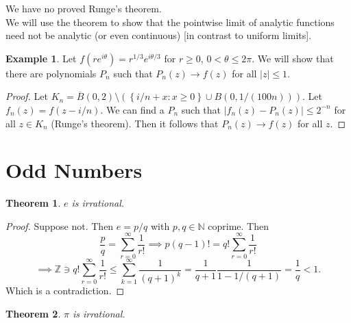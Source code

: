 \documentclass[a4paper, 10pt, twocolumn]{amsart}
\newtheorem*{theorem}{Theorem}
\theoremstyle{definition}
\newtheorem*{example}{Example}
\newcommand{\bb}[1]{\mathbb{#1}}
\newcommand{\1}{\mathbbm{1}}
\begin{document}
We have no proved Runge's theorem.\\

We will use the theorem to show that the pointwise limit of analytic functions need not be analytic (or even continuous) [in contrast to uniform limits].

\begin{example}
    Let $f(re^{i\theta}) = r^{1/3} e^{i \theta/3}$ for $r\ge 0$, $0<\theta\le 2\pi$. We will show that there are polynomials $P_n$ such that $P_n(z) \to f(z)$ for all $|z|\le 1$.
\end{example}

\begin{proof}
    Let $K_n = \overline{B}(0,2) \setminus \left(\left\{i/n +x : x\ge 0\right\} \cup B(0,1/(100n))\right)$. Let $f_n(z) = f(z-i/n)$. We can find a $P_n$ such that $|f_n(z)-P_n(z)|\le 2^{-n}$ for all $z\in K_n$ (Runge's theorem). Then it follows that $P_n(z) \to f(z)$ for all $z$.
\end{proof}

\section{Odd Numbers}

\begin{theorem}
    $e$ is irrational.
\end{theorem}

\begin{proof}
    Suppose not. Then $e = p/q$ with $p,q \in \bb{N}$ coprime. Then \[\frac{p}{q} = \sum_{r=0}^\infty \frac{1}{r!} \implies p(q-1)! = q! \sum_{r=0}^\infty \frac{1}{r!}\]
    \[\implies \bb{Z} \ni q! \sum_{r=0}^\infty \frac{1}{r!} \le \sum_{k=1}^\infty \frac{1}{(q+1)^k} = \frac{1}{q+1} \frac{1}{1-1/(q+1)} = \frac{1}{q} < 1.\]
    Which is a contradiction.
\end{proof}

\begin{theorem}
    $\pi$ is irrational.
\end{theorem}
\end{document}
